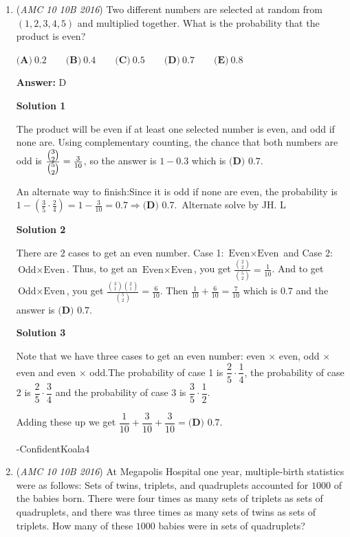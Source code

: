 \begin{enumerate}
 


	\item (\textit{AMC 10 10B 2016}) Two different numbers are selected at random from $( 1, 2, 3, 4, 5)$ and multiplied together. What is the probability that the product is even?


 $\textbf{(A)}\ 0.2\qquad\textbf{(B)}\ 0.4\qquad\textbf{(C)}\ 0.5\qquad\textbf{(D)}\ 0.7\qquad\textbf{(E)}\ 0.8$

 \textbf{Answer: }D



\textbf{Solution 1}

The product will be even if at least one selected number is even, and odd if none are. Using complementary counting, the chance that both numbers are odd is $\frac{\tbinom32}{\tbinom52}=\frac3{10}$, so the answer is $1-0.3$ which is $\boxed{\textbf{(D) }0.7}$.

 An alternate way to finish:Since it is odd if none are even, the probability is $1-(\frac{3}{5} \cdot \frac{2}{4})=1-\frac{3}{10}=0.7 \Longrightarrow \boxed{\textbf{(D) }0.7}$.~Alternate solve by JH. L

 



\textbf{Solution 2}

There are $2$ cases to get an even number. Case 1: $\text{Even} \times \text{Even}$ and Case 2: $\text{Odd} \times \text{Even}$. Thus, to get an $\text{Even} \times \text{Even}$, you get $\frac {\binom {2}{2}}{\binom {5}{2}}= \frac {1}{10}$. And to get $\text{Odd} \times \text{Even}$, you get $\frac {\binom {3}{1} \binom {2}{1}}{\binom {5}{2}}= \frac {6}{10}$. Then $\frac {1}{10}+\frac {6}{10}=\frac {7}{10}$ which is $0.7$ and the answer is $\boxed{\textbf{(D) }0.7}$.

 



\textbf{Solution 3}

Note that we have three cases to get an even number: even $\times$ even, odd $\times$ even and even $\times$ odd.The probability of case 1 is $\dfrac{2}{5}\cdot\dfrac{1}{4}$, the probability of case 2 is $\dfrac{2}{5}\cdot\dfrac{3}{4}$ and the probability of case 3 is $\dfrac{3}{5}\cdot\dfrac12$.

 Adding these up we get $\dfrac{1}{10}+\dfrac{3}{10}+\dfrac{3}{10} = \boxed{\textbf{(D) }0.7}.$

 -ConfidentKoala4

 


	\item (\textit{AMC 10 10B 2016}) At Megapolis Hospital one year, multiple-birth statistics were as follows: Sets of twins, triplets, and quadruplets accounted for $1000$ of the babies born. There were four times as many sets of triplets as sets of quadruplets, and there was three times as many sets of twins as sets of triplets. How many of these $1000$ babies were in sets of quadruplets?



\end{enumerate}
